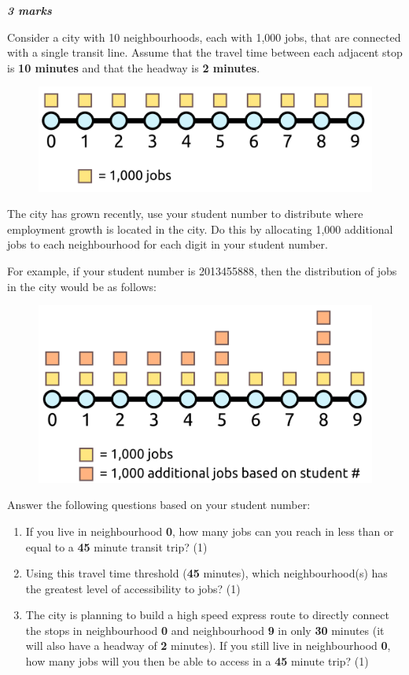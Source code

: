 \documentclass[11pt]{article}
\begin{document}
	\vspace{-2mm}
	\textbf{\textit{3 marks}}
	
	Consider a city with 10 neighbourhoods, each with 1,000 jobs, that are connected with a single transit line. Assume that the travel time between each adjacent stop is \textbf{10 minutes} and that the headway is \textbf{2 minutes}. 
	
	\begin{figure}[h]
		\centering
		\includegraphics[width=0.5\linewidth]{images/city_plain.png}
	\end{figure}

	The city has grown recently, use your student number to distribute where employment growth is located in the city. Do this by allocating 1,000 additional jobs to each neighbourhood for each digit in your student number.
	
	For example, if your student number is 2013455888, then the distribution of jobs in the city would be as follows:
	
	\begin{figure}[h]
		\centering
		\includegraphics[width=0.5\linewidth]{images/city_jobs.png}
	\end{figure}
	
	
	Answer the following questions based on your student number:
	
	\begin{enumerate}
		
		
		\item If you live in neighbourhood \textbf{0}, how many jobs can you reach in less than or equal to a \textbf{45} minute transit trip? (1) 
		
		\item Using this travel time threshold (\textbf{45} minutes), which neighbourhood(s) has the greatest level of accessibility to jobs? (1) 
		
		\item The city is planning to build a high speed express route to directly connect the stops in neighbourhood \textbf{0} and neighbourhood \textbf{9} in only \textbf{30} minutes (it will also have a headway of \textbf{2} minutes). If you still live in neighbourhood \textbf{0}, how many jobs will you then be able to access in a \textbf{45} minute trip? (1) 
		
	\end{enumerate}
\end{document}
